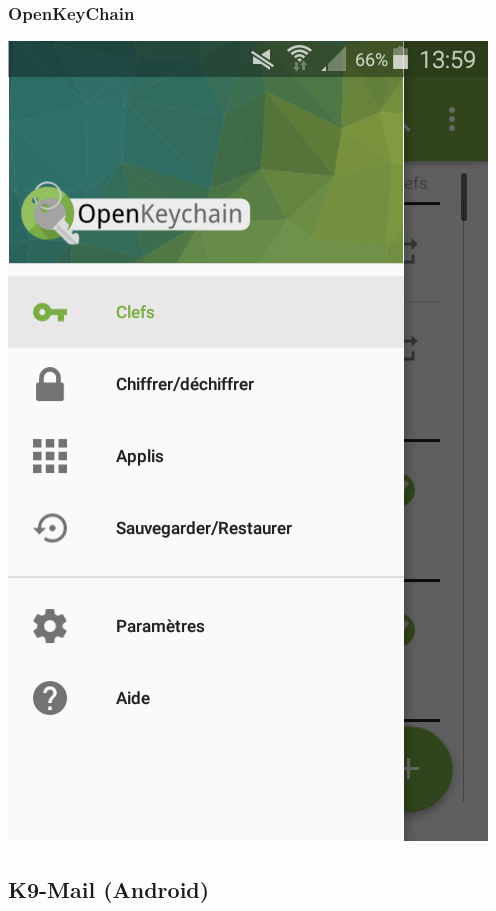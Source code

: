 \documentclass{beamer}
\begin{document}
\begin{frame}
\frametitle{OpenKeyChain}
\centering
    	\includegraphics[keepaspectratio, scale=0.25]{figures/okc.png}
\end{frame}


\subsection{K9-Mail (Android)}
\end{document}
